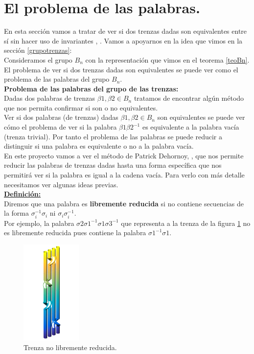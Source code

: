 \section{El problema de las palabras.}\label{deh}
En esta sección vamos a tratar de ver si dos trenzas dadas son equivalentes entre sí sin hacer uso de invariantes \cite{4}, \cite{11}. Vamos a apoyarnos en la idea que vimos en la sección \ref{grupotrenzas}:\\

Consideramos el grupo $ B_{n} $ con la representación que vimos en el teorema \ref{teoBn}. El problema de ver si dos trenzas dadas son equivalentes se puede ver como el problema de las palabras del grupo $ B_{n} $.\\

\textbf{Problema de las palabras del grupo de las trenzas:}\\
Dadas dos palabras de trenzas $\beta1, \beta2 \in B_{n}$ tratamos de encontrar algún método que nos permita confirmar si son o no equivalentes. \\

Ver si dos palabras (de trenzas) dadas $\beta1, \beta2 \in B_{n}$ son equivalentes se puede ver cómo el problema de ver si la palabra $\beta1\beta2^{-1}$ es equivalente a la palabra vacía (trenza trivial). Por tanto el problema de las palabras se puede reducir a distinguir si una palabra es equivalente o no a la palabra vacía. \\

En este proyecto vamos a ver el método de Patrick Dehornoy, \cite{4}, que nos permite reducir las palabras de trenzas dadas hasta una forma específica que nos permitirá ver si la palabra es igual a la cadena vacía. Para verlo con más detalle necesitamos ver algunas ideas previas.\\

\underline{\textbf{Definición:}}\\
Diremos que una palabra es \textbf{libremente reducida} si no contiene secuencias de la forma $\sigma_{i}^{-1}\sigma_{i} $ ni $\sigma_{i}\sigma_{i}^{-1}$.\\

Por ejemplo, la palabra $\sigma2\sigma1^{-1}\sigma1\sigma3^{-1}$ que representa a la trenza de la figura \ref{deh1} no es libremente reducida pues contiene la palabra $\sigma1^{-1}\sigma1$.\\

	\begin{figure}[h!]
		\centering
		\includegraphics[width=3cm]{itrenzas/deh1.png}
		\caption{Trenza no libremente reducida.}
		\label{deh1} 
	\end{figure}

